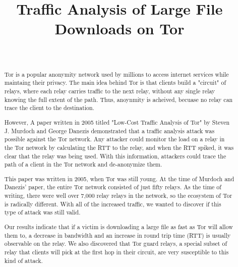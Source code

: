 \documentclass[12pt,journal]{IEEEtran}
\begin{document}
\title{Traffic Analysis of Large File Downloads on Tor}
\author{\\
        }
\maketitle

\begin{abstract}
Tor is a popular anonymity network used by millions to access internet services while maintaing their privacy. The main idea behind Tor is that clients build a "circuit" of relays, where each relay carries traffic to the next relay, without any single relay knowing the full extent of the path. Thus, anoynmity is acheived, becuase no relay can trace the client to the destination. 

However, A paper written in 2005 titled "Low-Cost Traffic Analysis of Tor" by Steven J. Murdoch and George Danezis demonstrated that a traffic analysis attack was possible against the Tor network. Any attacker could monitor the load on a relay in the Tor network by calculating the RTT to the relay, and when the RTT spiked, it was clear that the relay was being used. With this information, attackers could trace the path of a client in the Tor network and de-anonymize them.

This paper was written in 2005, when Tor was still young. At the time of Murdoch and Danezis' paper, the entire Tor network consisted of just fifty relays. As the time of writing, there were well over 7,000 relay relays in the network, so the ecosystem of Tor is radically different. With all of the increased traffic, we wanted to discover if this type of attack was still valid.

Our results indicate that if a victim is downloading a large file as fast as Tor will allow them to, a decrease in bandwidth and an increase in round trip time (RTT) is usually observable on the relay. We also discovered that Tor guard relays, a special subset of relay that clients will pick at the first hop in their circuit, are very susceptible to this kind of attack.

\end{abstract}
\end{document}
